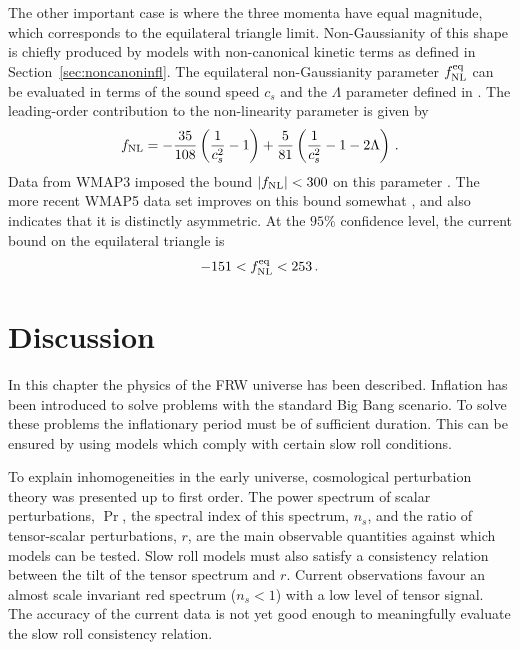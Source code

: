 The other important case is   
where the three momenta have equal magnitude, which corresponds to the
equilateral triangle limit. Non-Gaussianity of this shape is chiefly produced
by models with non-canonical kinetic terms as defined in
Section~\ref{sec:noncanoninfl}. The equilateral non-Gaussianity parameter
$f_{\mathrm{NL}}^{\mathrm{eq}}$ can be evaluated in terms of the sound speed $c_s$ and the
$\Lambda$ parameter defined in .
The leading-order contribution to the
non-linearity 
parameter is given by \cite{chenetal,lidser3}
% 
\begin{equation} 
\label{eq:fnldefn-dbiintro}
 f_{\mathrm{NL}} = -\frac{35}{108}\left(\frac{1}{c_s^2} -1 \right) +
\frac{5}{81}\left( \frac{1}{c_s^2} -1 -2\Lambda \right) \,.
\end{equation}
%  
Data from WMAP3 imposed the bound $|f_{\mathrm{NL}}| < 300$ on this parameter
\cite{spergel}. The more recent WMAP5 data set
improves on this bound somewhat \cite{Komatsu:2008hk}, and
also indicates that it is distinctly asymmetric. At the $95 \%$ confidence
level, the current bound on the 
equilateral triangle is 
% 
\begin{equation}
\label{eq:fnleq-wmap5-intro}
 -151<f_{\mathrm{NL}}^{\mathrm{eq}}<253\,.
\end{equation}
% 


\section{Discussion}
\label{sec:disc-intro}

In this chapter the physics of the FRW universe has been described. Inflation has been introduced
to solve problems with the standard Big Bang scenario. To solve these problems the
inflationary
period must be of sufficient duration. This can be ensured by using models which comply with
certain slow roll conditions. 

To explain inhomogeneities in the early universe, cosmological perturbation theory
was presented up
to first order. The power spectrum of scalar perturbations, $\Pr$, the spectral index of this
spectrum, $n_s$, and the ratio of tensor-scalar perturbations, $r$, are the main
observable
quantities against which models can be tested. Slow roll models must also satisfy a
consistency
relation between the tilt of the tensor spectrum and $r$. Current observations favour an almost
scale invariant red spectrum ($n_s<1$) with a low level of tensor signal. The accuracy of the
current data is not yet good enough to meaningfully evaluate the slow roll consistency relation. 

